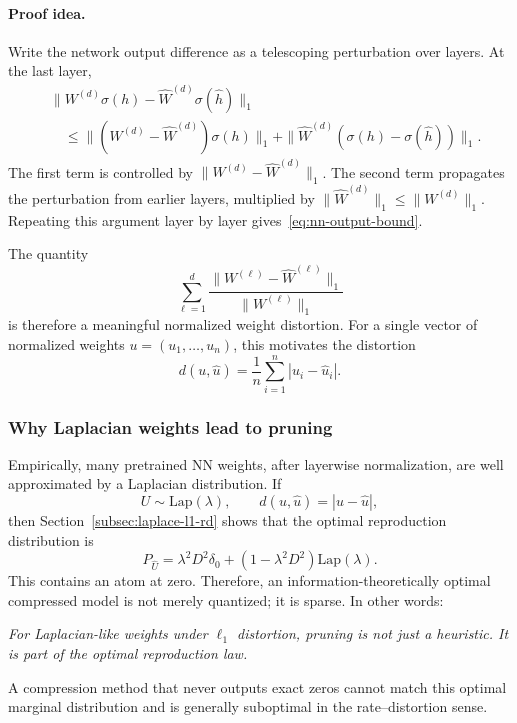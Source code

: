 \paragraph{Proof idea.}
Write the network output difference as a telescoping perturbation over layers.
At the last layer,
\begin{align}
&\|W^{(d)}\sigma(h)-\widehat W^{(d)}\sigma(\widehat h)\|_1 \\
&\quad\le
\|(W^{(d)}-\widehat W^{(d)})\sigma(h)\|_1
+
\|\widehat W^{(d)}(\sigma(h)-\sigma(\widehat h))\|_1.
\end{align}
The first term is controlled by $\|W^{(d)}-\widehat W^{(d)}\|_1$.
The second term propagates the perturbation from earlier layers, multiplied by $\|\widehat W^{(d)}\|_1\le \|W^{(d)}\|_1$.
Repeating this argument layer by layer gives~\eqref{eq:nn-output-bound}.

The quantity
\begin{equation}
    \sum_{\ell=1}^{d}\frac{\|W^{(\ell)}-\widehat W^{(\ell)}\|_1}{\|W^{(\ell)}\|_1}
\end{equation}
is therefore a meaningful normalized weight distortion.
For a single vector of normalized weights $u=(u_1,\ldots,u_n)$, this motivates the distortion
\begin{equation}
    d(u,\widehat u)=\frac1n\sum_{i=1}^n |u_i-\widehat u_i|.
\end{equation}

\subsubsection*{Why Laplacian weights lead to pruning}

Empirically, many pretrained NN weights, after layerwise normalization, are well approximated by a Laplacian distribution.
If
\[
    U\sim \mathrm{Lap}(\lambda),
    \qquad
    d(u,\widehat u)=|u-\widehat u|,
\]
then Section~\ref{subsec:laplace-l1-rd} shows that the optimal reproduction distribution is
\[
    P_{\widehat U}
    =\lambda^2D^2\delta_0+(1-\lambda^2D^2)\mathrm{Lap}(\lambda).
\]
This contains an atom at zero.
Therefore, an information-theoretically optimal compressed model is not merely quantized; it is sparse.
In other words:
\begin{center}
\emph{For Laplacian-like weights under $\ell_1$ distortion, pruning is not just a heuristic.  It is part of the optimal reproduction law.}
\end{center}
A compression method that never outputs exact zeros cannot match this optimal marginal distribution and is generally suboptimal in the rate--distortion sense.

